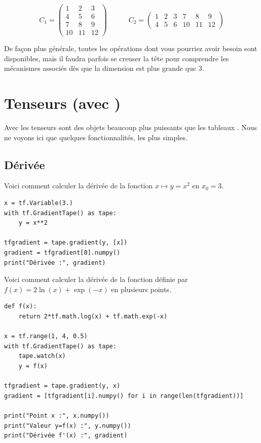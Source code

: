 \documentclass[11pt,class=report,crop=false]{standalone}
\begin{document}
$$C_1 = \begin{pmatrix}
 1 & 2 & 3 \\
 4 & 5 & 6 \\
 7 & 8 & 9 \\
10 & 11 & 12
\end{pmatrix}
\qquad\quad
C_2 = \begin{pmatrix}
 1 & 2 & 3 & 7 & 8 & 9 \\
 4 & 5 & 6 & 10 & 11 & 12
\end{pmatrix}
$$

\bigskip

De façon plus générale, toutes les opérations dont vous pourriez avoir besoin sont disponibles, mais il faudra parfois se creuser la tête pour comprendre les mécanismes associés dès que la dimension est plus grande que $3$.


\section{Tenseurs (avec \tensorflow)}

Avec \tensorflow{} les tenseurs sont des objets beaucoup plus puissants que les tableaux \numpy. 
Nous ne voyons ici que quelques fonctionnalités, les plus simples.


\subsection{Dérivée}

Voici comment calculer la dérivée de la fonction $x \mapsto y=x^2$ en $x_0=3$.
\begin{lstlisting}
x = tf.Variable(3.)
with tf.GradientTape() as tape:
    y = x**2

tfgradient = tape.gradient(y, [x])
gradient = tfgradient[0].numpy()
print("Dérivée :", gradient)
\end{lstlisting}


Voici comment calculer la dérivée de la fonction définie par $f(x) = 2\ln(x)+\exp(-x)$ en plusieurs points.

\begin{lstlisting}
def f(x):
    return 2*tf.math.log(x) + tf.math.exp(-x)

x = tf.range(1, 4, 0.5)
with tf.GradientTape() as tape:
    tape.watch(x)
    y = f(x)

tfgradient = tape.gradient(y, x)
gradient = [tfgradient[i].numpy() for i in range(len(tfgradient))]

print("Point x :", x.numpy())
print("Valeur y=f(x) :", y.numpy())
print("Dérivée f'(x) :", gradient)	
\end{lstlisting}
\end{document}
